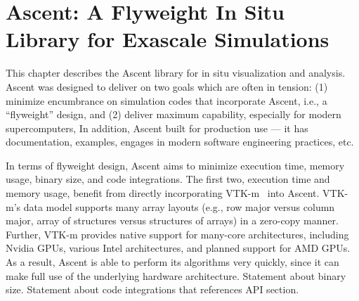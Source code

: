 %
%
%
\chapter{Ascent: A Flyweight In Situ Library for Exascale Simulations}
\label{ascent} %


This chapter describes the Ascent library for in situ visualization
and analysis.
%
Ascent was designed to deliver on two goals which are often in tension:
 (1) minimize encumbrance on simulation codes that incorporate Ascent,
i.e., a ``flyweight'' design, and
(2) deliver maximum capability, especially for modern supercomputers,
%
In addition, Ascent built for production use --- it has documentation,
examples, engages in modern software engineering practices, etc.

In terms of flyweight design, Ascent aims to minimize
execution time, memory usage, binary size, and code integrations.
%
The first two, execution time and memory usage, benefit from directly
incorporating VTK-m~\cite{VTK-m} into Ascent.
%
VTK-m's data model supports many array layouts (e.g., row major versus
column major, array of structures versus structures of arrays)
in a zero-copy manner.
%
Further, VTK-m provides native support for many-core architectures,
including Nvidia GPUs, various Intel architectures,
and planned support for AMD GPUs.
%
As a result, Ascent is able to perform its algorithms very quickly,
since it can make full use of the underlying hardware architecture.
%
Statement about binary size.
%
Statement about code integrations that references API section.

